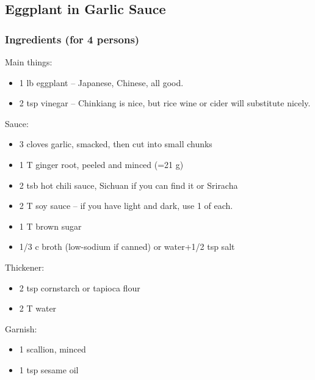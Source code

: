 \subsection{Eggplant in Garlic Sauce}
\subsubsection*{Ingredients (for 4 persons)}
Main things:
\begin{itemize}
  \item[] 1 lb eggplant – Japanese, Chinese, all good.
  \item[] 2 tsp vinegar – Chinkiang is nice, but rice wine or cider will substitute nicely.
\end{itemize}
Sauce:
\begin{itemize}
  \item[] 3 cloves garlic, smacked, then cut into small chunks
  \item[] 1 T ginger root, peeled and minced (=21 g)
  \item[] 2 tsb hot chili sauce, Sichuan if you can find it or Sriracha
  \item[] 2 T soy sauce – if you have light and dark, use 1 of each.
  \item[] 1 T brown sugar
  \item[] 1/3 c broth (low-sodium if canned) or water+1/2 tsp salt
\end{itemize}
Thickener:
\begin{itemize}
\item[] 2 tsp cornstarch or tapioca flour
\item[] 2 T water
\end{itemize}
Garnish:
\begin{itemize}
\item[] 1 scallion, minced
\item[] 1 tsp sesame oil
\end{itemize}

